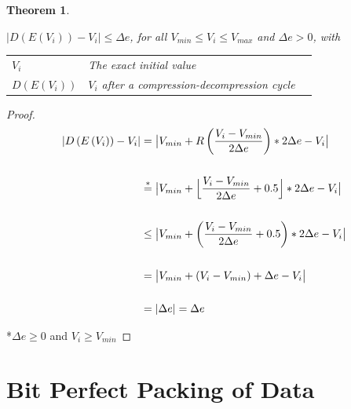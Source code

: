 \documentclass[
	12pt,
	a4paper,
	BCOR10mm,
	DIV14,
	headsepline,
]{scrreprt}
\newtheorem{theorem}{Theorem}
\DeclarePairedDelimiter{\floor}{\lfloor}{\rfloor}
\DeclarePairedDelimiter{\abs}{\lvert}{\rvert}
\begin{document}
\bigskip

\begin{theorem}

	\mbox{} \bigskip

	\begin{center}
		$\lvert D\left(E\left(V_i\right)\right) - V_i\rvert \leq \Delta{e}$, for all $V_{min} \leq V_i \leq V_{max}$ and $\Delta{e} > 0$, with \\

		\bigskip

		\begin{tabular}{lll}
 			$V_i$ & The exact initial value \\
			$D\left(E\left(V_i\right)\right)$ & $V_i$ after a compression-decompression cycle \\
		\end{tabular}

	\end{center}

\end{theorem}

\begin{proof}
	\begin{align*}
	  \lvert D\left(E\left(V_i\right)\right) - V_i\rvert
	  &=\abs[\big]{V_{min} + R\left(\frac{V_i - V_{min}}{2\Delta{e}}\right) * 2\Delta{e} - V_i} \\
	  &\\
	  &\stackrel{*}{=}\abs[\big]{V_{min} + \floor[\Big]{\frac{V_i - V_{min}}{2\Delta{e}} + 0.5} * 2\Delta{e} - V_i} \\
	  &\\
	  &\le\abs[\big]{V_{min} + \left(\frac{V_i - V_{min}}{2\Delta{e}} + 0.5\right) * 2\Delta{e} - V_i} \\
	  &\\
	  &=\abs[\big]{V_{min} + \left(V_i - V_{min}\right) + \Delta{e} - V_i} \\
	  &\\
	  &=\abs{\Delta{e}} = \Delta{e} \qedhere
	\end{align*}

	\vfill

	\scriptsize{*$\Delta{e}\ge 0$ and $V_i\ge V_{min}$}

\end{proof}

\chapter{Bit Perfect Packing of Data}
\label{bit_perf}
\end{document}
